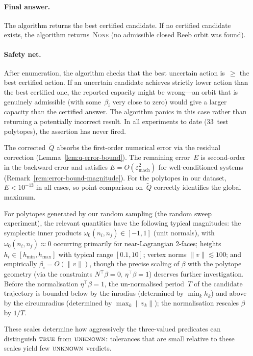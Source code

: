 \paragraph{Final answer.}
The algorithm returns the best certified candidate.
If no certified candidate exists, the algorithm
returns~\textsc{None} (no admissible closed Reeb
orbit was found).

\paragraph{Safety net.}
After enumeration, the algorithm checks that the best
uncertain action is~$\geq$ the best certified action.
If an uncertain candidate achieves strictly lower action
than the best certified one, the reported capacity might
be wrong---an orbit that is genuinely admissible
(with some~$\beta_i$ very close to zero) would give
a larger capacity than the certified answer.
The algorithm panics in this case rather than returning
a potentially incorrect result.
In all experiments to date (33~test polytopes),
the assertion has never fired.

\begin{remark}%
\label{rem:point-comparison}
The corrected~$\tilde Q$ absorbs the first-order
numerical error via the residual correction
(Lemma~\ref{lem:q-error-bound}).
The remaining error~$E$ is second-order
in the backward error and satisfies
$E = O(\varepsilon_{\mathrm{mach}}^2)$ for
well-conditioned systems
(Remark~\ref{rem:error-bound-magnitude}).
For the polytopes in our dataset,
$E < 10^{-13}$ in all cases, so point comparison
on~$\tilde Q$ correctly identifies the global
maximum.
\end{remark}

\begin{remark}\label{rem:parameter-scales}
For polytopes generated by our random sampling
(the random sweep experiment),
the relevant quantities have the following typical magnitudes:
the symplectic inner products
$\omega_0(n_i, n_j) \in [-1, 1]$ (unit normals),
with $\omega_0(n_i, n_j) \approx 0$ occurring primarily
for near-Lagrangian 2-faces;
heights $h_i \in [h_{\min}, h_{\max}]$ with typical range
$[0.1, 10]$;
vertex norms $\|v\| \lesssim 100$;
and empirically $\beta_i = O(\|v\|)$, though the precise
scaling of $\beta$ with the polytope geometry (via the
constraints $N^\top \beta = 0$, $\eta^\top \beta = 1$)
deserves further investigation.
Before the normalisation $\eta^\top \beta = 1$,
the un-normalised period~$T$ of the candidate trajectory is bounded below
by the inradius (determined by $\min_k h_k$) and above by
the circumradius (determined by $\max_k \|v_k\|$);
the normalisation rescales $\beta$ by $1/T$.

These scales determine how aggressively the three-valued
predicates can distinguish $\textsc{true}$ from
$\textsc{unknown}$:
tolerances that are small relative to these scales yield
few $\textsc{unknown}$ verdicts.
\end{remark}
